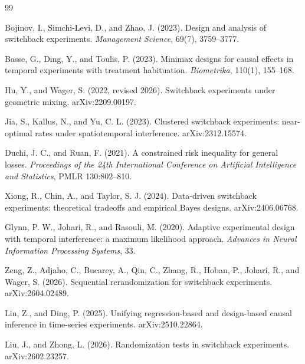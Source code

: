 \documentclass{article}
\begin{document}
\begin{thebibliography}{99}

   Bojinov, I., Simchi-Levi, D., and Zhao, J. (2023). Design and analysis of switchback experiments. \emph{Management Science}, 69(7), 3759--3777.

   Basse, G., Ding, Y., and Toulis, P. (2023). Minimax designs for causal effects in temporal experiments with treatment habituation. \emph{Biometrika}, 110(1), 155--168.

   Hu, Y., and Wager, S. (2022, revised 2026). Switchback experiments under geometric mixing. arXiv:2209.00197.

   Jia, S., Kallus, N., and Yu, C. L. (2023). Clustered switchback experiments: near-optimal rates under spatiotemporal interference. arXiv:2312.15574.

   Duchi, J. C., and Ruan, F. (2021). A constrained risk inequality for general losses. \emph{Proceedings of the 24th International Conference on Artificial Intelligence and Statistics}, PMLR 130:802--810.

   Xiong, R., Chin, A., and Taylor, S. J. (2024). Data-driven switchback experiments: theoretical tradeoffs and empirical Bayes designs. arXiv:2406.06768.

   Glynn, P. W., Johari, R., and Rasouli, M. (2020). Adaptive experimental design with temporal interference: a maximum likelihood approach. \emph{Advances in Neural Information Processing Systems}, 33.

   Zeng, Z., Adjaho, C., Bucarey, A., Qin, C., Zhang, R., Hoban, P., Johari, R., and Wager, S. (2026). Sequential rerandomization for switchback experiments. arXiv:2604.02489.

   Lin, Z., and Ding, P. (2025). Unifying regression-based and design-based causal inference in time-series experiments. arXiv:2510.22864.

   Liu, J., and Zhong, L. (2026). Randomization tests in switchback experiments. arXiv:2602.23257.

\end{thebibliography}
\end{document}
